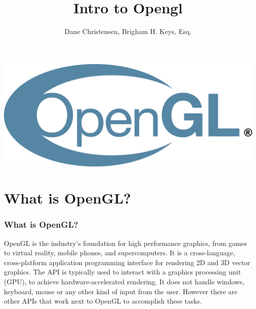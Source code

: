 \documentclass{beamer}
\title[Hello Triangle]{Intro to Opengl} %
\author{Dane Christensen, Brigham H. Keys, Esq.} %
\institute[BYU-I] %
          {
            BYU-Idaho \\ %
            \medskip
            \textit{key13005@byui.edu} %
          }
\begin{document}
          \begin{frame}
            \titlepage %
            \includegraphics[scale=.1]{logo.png}
          \end{frame}



          \section{What is OpenGL?} %

          \begin{frame}
            \frametitle{What is OpenGL?}
            OpenGL is the industry's foundation for high performance graphics, from games to virtual reality, mobile phones, and supercomputers. It is a cross-language, cross-platform application programming interface for rendering 2D and 3D vector graphics. The API is typically used to interact with a graphics processing unit (GPU), to achieve hardware-accelerated rendering. It does not handle windows, keyboard, mouse or any other kind of input from the user. However there are other APIs that work next to OpenGL to accomplish these tasks.
          \end{frame}
\end{document}
